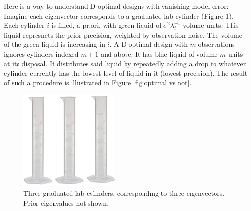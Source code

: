 \clusterization


\noclusterization

Here is a way to understand D-optimal designs with vanishing model
error: Imagine each eigenvector corresponds to a graduated lab
cylinder (Figure \ref{fig:cylinder}). Each cylinder $i$ is filled,
a-priori, with green liquid of $\sigma^2\lambda_i^{-1}$ volume
units. This liquid represnets the prior precision, weighted by
observation noise. The volume of the green liquid is increasing in
$i$. A D-optimal design with $m$ observations ignores cylinders
indexed $m+1$ and above. It has blue liquid of volume $m$ units at its
disposal. It distributes said liquid by repeatedly adding a drop to
whatever cylinder currently has the lowest level of liquid in it
(lowest precision). The result of such a procedure is illustrated in
Figure \ref{fig:optimal vs not}.

\begin{figure}%
    \includegraphics[width=5cm, height=5cm]{cylinders.jpg}
    \caption{Three graduated lab cylinders, corresponding to three
      eigenvectors. Prior eigenvalues not shown.}
    \label{fig:cylinder}
\end{figure}




